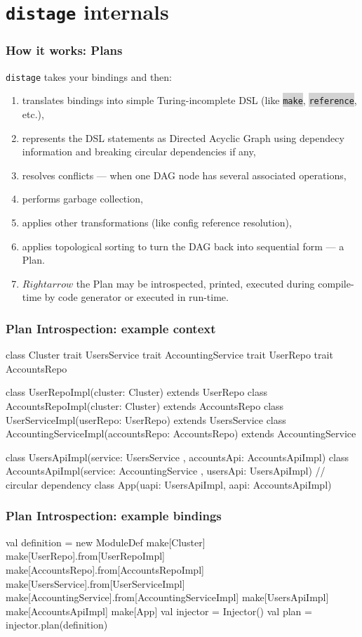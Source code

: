 \documentclass[usenames,dvipsnames]{beamer}
\newcommand{\code}[1]{\colorbox{lightgray}{\texttt{#1}}}
\newcommand{\distage}{\texttt{distage}\xspace}
\begin{document}
\section{\distage{} internals}
\begin{frame}
  \frametitle{How it works: Plans}
  \distage takes your bindings and then:
  \begin{enumerate}
    \item translates bindings into simple Turing-incomplete DSL (like \code{make}, \code{reference}, etc.),
    \item represents the DSL statements as Directed Acyclic Graph using dependecy information and breaking circular dependencies if any,
    \item resolves conflicts --- when one DAG node has several associated operations,
    \item performs garbage collection,
    \item applies other transformations (like config reference resolution),
    \item applies topological sorting to turn the DAG back into sequential form --- a Plan.
    \item $Rightarrow$ the Plan may be introspected, printed, executed during compile-time by code generator or executed in run-time.
  \end{enumerate}
\end{frame}

\begin{frame}[fragile]
\frametitle{Plan Introspection: example context}
\begin{scalacode}
class Cluster
trait UsersService
trait AccountingService
trait UserRepo
trait AccountsRepo

class UserRepoImpl(cluster: Cluster) extends UserRepo
class AccountsRepoImpl(cluster: Cluster) extends AccountsRepo
class UserServiceImpl(userRepo: UserRepo) extends UsersService
class AccountingServiceImpl(accountsRepo: AccountsRepo)
    extends AccountingService

class UsersApiImpl(service: UsersService
    , accountsApi: AccountsApiImpl)
class AccountsApiImpl(service: AccountingService
    , usersApi: UsersApiImpl) // circular dependency
class App(uapi: UsersApiImpl, aapi: AccountsApiImpl)
\end{scalacode}
\end{frame}

\begin{frame}[fragile]
\frametitle{Plan Introspection: example bindings\footnotemark[1]}
\begin{scalacode}
val definition = new ModuleDef {
    make[Cluster]
    make[UserRepo].from[UserRepoImpl]
    make[AccountsRepo].from[AccountsRepoImpl]
    make[UsersService].from[UserServiceImpl]
    make[AccountingService].from[AccountingServiceImpl]
    make[UsersApiImpl]
    make[AccountsApiImpl]
    make[App]
}
val injector = Injector()
val plan = injector.plan(definition)
\end{scalacode}
\end{frame}
\end{document}
